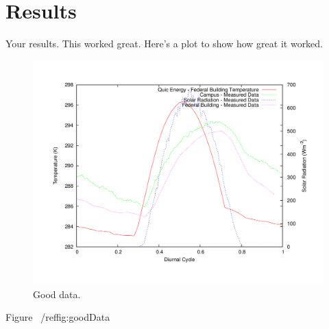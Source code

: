 \chapter{Results}
\label{chap:results}

Your results.  This worked great.  Here's a plot to show how great it worked.  

\begin{figure}[htp] 
\centering
\includegraphics[scale=.4]{images/goodData.png}
\caption{Good data.}
\label{fig:goodData}
\end{figure} 

Figure ~/ref{fig:goodData}
